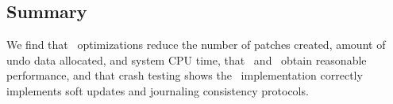 \subsection{Summary}
\label{sec:evaluation:summary}

We find
%
that \patchgroup\ optimizations reduce the number of patches created,
amount of undo data allocated, and system CPU time,
%
that \Kudos\ and \patchgroups\ obtain reasonable performance,
%
and that crash testing shows the \Kudos\ implementation correctly
implements soft updates and journaling consistency protocols.

